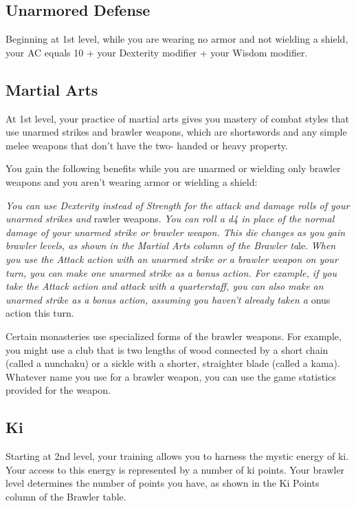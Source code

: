 \subsection{Unarmored Defense}

Beginning at 1st level, while you are wearing no armor and not wielding a shield, your AC equals 10 + your Dexterity modifier + your Wisdom modifier.

\subsection{Martial Arts}

At 1st level, your practice of martial arts gives you mastery of combat styles that use unarmed strikes and brawler weapons, which are shortswords and any simple melee weapons that don’t have the two- handed or heavy property.

You gain the following benefits while you are unarmed or wielding only brawler weapons and you aren’t wearing armor or wielding a shield:

\textit{ You can use Dexterity instead of Strength for the attack and damage rolls of your unarmed strikes and }rawler weapons.
\textit{ You can roll a d4 in place of the normal damage of your unarmed strike or brawler weapon. This die changes as you gain brawler levels, as shown in the Martial Arts column of the Brawler ta}le.
\textit{ When you use the Attack action with an unarmed strike or a brawler weapon on your turn, you can make one unarmed strike as a bonus action. For example, if you take the Attack action and attack with a quarterstaff, you can also make an unarmed strike as a bonus action, assuming you haven’t already taken a }onus action this turn.

Certain monasteries use specialized forms of the brawler weapons. For example, you might use a club that is two lengths of wood connected by a short chain (called a nunchaku) or a sickle with a shorter, straighter blade (called a kama). Whatever name you use for a brawler weapon, you can use the game statistics provided for the weapon.

\subsection{Ki}

Starting at 2nd level, your training allows you to harness the mystic energy of ki. Your access to this energy is represented by a number of ki points. Your brawler level determines the number of points you have, as shown in the Ki Points column of the Brawler table.

